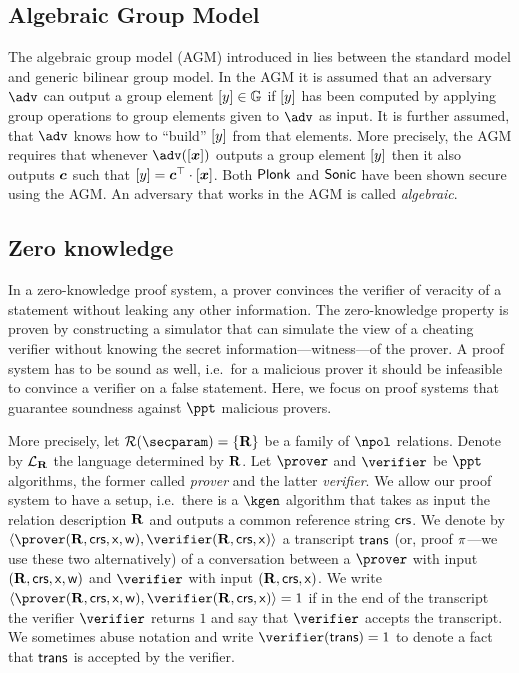\let\accentvec\vec \documentclass[runningheads,10pt]{llncs}
\def\vec#1{\mathchoice{\mbox{\boldmath$\displaystyle#1$}}
{\mbox{\boldmath$\textstyle#1$}} {\mbox{\boldmath$\scriptstyle#1$}}
{\mbox{\boldmath$\scriptscriptstyle#1$}}}
\begin{document}
\subsection{Algebraic Group Model}
The algebraic group model (AGM) introduced in \cite{C:FucKilLos18} lies
between the standard model and generic bilinear group model. In the AGM it is
assumed that an adversary $\adv$ can output a group element $\left[y\right] \in
\mathbb{G}$ if $\left[y\right]$ has been computed by applying group operations to group
elements given to $\adv$ as input. It is further assumed, that $\adv$ knows
how to ``build'' $\left[y\right]$ from that elements. More precisely, the AGM
requires that whenever $\adv(\gnone{\vec{x}})$ outputs a group element
$\left[y\right]$ then it also outputs $\vec{c}$ such that $\gnone{y} = \vec{c}^\top
\cdot \gnone{\vec{x}}$. Both $\textnormal{\textsf{Plonk}}$ and ${\textnormal{\textsf{Sonic}}}$
have been shown secure using the AGM. An adversary that works in the AGM is
called \emph{algebraic}. 

\subsection{Zero knowledge}
In a zero-knowledge proof system, a prover convinces the verifier of
 veracity of a statement without leaking any other information. 
The zero-knowledge property is proven by constructing a simulator that can
simulate the view of a cheating verifier without knowing the secret
information---witness---of the prover.
 A proof system
 has to be sound as well, i.e.~for a malicious prover it should be infeasible
 to convince a verifier on a false statement.
Here, we focus on proof systems that guarantee soundness against $\ppt$
malicious provers.

More precisely, let $\RELGEN(\secparam) = \smallset{\REL}$ be a family of
$\npol$ relations.
Denote by $\mathcal{L}_{\mathbf{R}}$ the language determined by $\mathbf{R}$.
Let $\prover$ and $\verifier$ be $\ppt$ algorithms, the former called \emph{prover}
and the latter \emph{verifier}. We allow our proof system to have a setup,
i.e.~there is a $\kgen$ algorithm that takes as input the relation
description $\mathbf{R}$ and
outputs a common reference string $\mathsf{crs}$.
We denote by $\ip{\prover(\REL, \crs, \inp, \wit)}{\verifier(\REL,
\crs,\inp)}$ a transcript $\mathsf{trans}$ (or, proof $\pi$---we use these two
alternatively) of a conversation between a $\prover$ with input
$(\mathbf{R}, \mathsf{crs}, \mathsf{x}, \mathsf{w})$ and $\verifier$ with input $(\mathbf{R}, \mathsf{crs}, \mathsf{x})$.
We write $\ip{\prover (\REL, \crs, \inp, \wit)}{\verifier(\REL, \crs, \inp)} =
1$ if in the end of the transcript the verifier $\verifier$ returns $1$ and
say that $\verifier$ accepts the transcript. We sometimes abuse notation and
write $\verifier(\trans) = 1$ to denote a fact that $\mathsf{trans}$ is accepted by
the verifier. 
\end{document}
